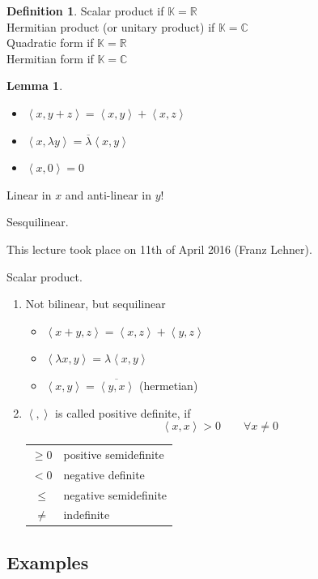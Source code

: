 \documentclass[a4paper,landscape,twocolumn]{article}
\newcommand\meta[3]{This #1 took place on #2 (#3).\par}
\newcommand\functional[1]{\left\langle{#1}\right\rangle}
\theoremstyle{definition}
\newtheorem{defi}{Definition}
\newtheorem{lemma}{Lemma}
\begin{document}
\begin{defi}
  Scalar product if $\mathbb K = \mathbb R$ \\
  Hermitian product (or unitary product) if $\mathbb K = \mathbb C$ \\

  Quadratic form if $\mathbb K = \mathbb R$ \\
  Hermitian form if $\mathbb K = \mathbb C$
\end{defi}

\begin{lemma}
  \begin{itemize}
    \item $\functional{x,y+z} = \functional{x,y} + \functional{x,z}$
    \item $\functional{x,\lambda y} = \overline{\lambda} \functional{x,y}$
    \item $\functional{x,0} = 0$
  \end{itemize}
  Linear in $x$ and anti-linear in $y$!

  Sesquilinear.
\end{lemma}


\meta{lecture}{11th of April 2016}{Franz Lehner}

Scalar product.
\begin{enumerate}
  \item Not bilinear, but sequilinear
    \begin{itemize}
      \item $\functional{x+y, z} = \functional{x,z} + \functional{y,z}$
      \item $\functional{\lambda x, y} = \lambda \functional{x,y}$
      \item $\functional{x,y} = \overline{\functional{y,x}}$ (hermetian)
    \end{itemize}
  \item $\functional{,}$ is called positive definite, if
    \[ \functional{x,x} > 0 \qquad \forall x \neq 0 \]
    \begin{tabular}{cl}
      $\geq 0$ & positive semidefinite \\
      $<0$ & negative definite \\
      $\leq$ & negative semidefinite \\
      $\neq$ & indefinite
    \end{tabular}
\end{enumerate}

\subsection{Examples}
\label{ex-8.15}
\end{document}
